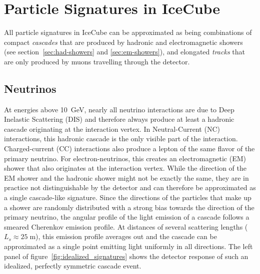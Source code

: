 \section{Particle Signatures in IceCube}
\label{sec:particle-signatures}
All particle signatures in IceCube can be approximated as being combinations of compact \emph{cascades} that are produced by hadronic and electromagnetic showers (see section~\ref{sec:had-showers} and \ref{sec:em-showers}), and elongated \emph{tracks} that are only produced by muons travelling through the detector.

\subsection{Neutrinos}

At energies above 10~GeV, nearly all neutrino interactions are due to Deep Inelastic Scattering (DIS) and therefore always produce at least a hadronic cascade originating at the interaction vertex. In Neutral-Current (NC) interactions, this hadronic cascade is the only visible part of the interaction. Charged-current (CC) interactions also produce a lepton of the same flavor of the primary neutrino. For electron-neutrinos, this creates an electromagnetic (EM) shower that also originates at the interaction vertex. While the direction of the EM shower and the hadronic shower might not be exactly the same, they are in practice not distinguishable by the detector and can therefore be approximated as a single cascade-like signature. Since the directions of the particles that make up a shower are randomly distributed with a strong bias towards the direction of the primary neutrino, the angular profile of the light emission of a cascade follows a smeared Cherenkov emission profile. At distances of several scattering lengths ($L_s\approx25\;\mathrm{m}$), this emission profile averages out and the cascade can be approximated as a single point emitting light uniformly in all directions. The left panel of figure~\ref{fig:idealized_signatures} shows the detector response of such an idealized, perfectly symmetric cascade event.
